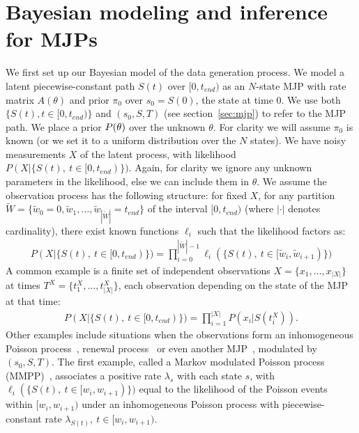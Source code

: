 \section{Bayesian modeling and inference for MJPs}
\label{sec:bayes_model}
We first set up our Bayesian model of the data generation process. 
We model a latent piecewise-constant path $S(t)$ over $[0,t_{end})$ as an $N$-state MJP with rate matrix $A(\theta)$ and prior $\pi_0$ over $s_0 = S(0)$, the state at time $0$. 
We use both $\{S(t), t \in [0,t_{end})\}$ and $(s_0,S,T)$ (see section~\ref{sec:mjp}) to refer to the MJP path.
We place a prior $P(\theta)$ over the unknown $\theta$. 
For clarity we will assume $\pi_0$ is known (or we set it to a uniform distribution over the $N$ states). 
We have noisy measurements $X$ of the latent process, with likelihood $P(X|\{S(t),\ t \in [0,t_{end})\})$.
Again, for clarity we ignore any unknown parameters in the likelihood, else we can include them in $\theta$.
We assume the observation process has the following structure: for fixed $X$, for any partition $\tilde{W} = \{\tilde{w}_0 = 0, \tilde{w}_1, \dotsc, \tilde{w}_{|\tilde{W}|}=t_{end}\}$ of the interval $[0,t_{end})$ (where $|\cdot|$ denotes cardinality), there exist known functions $\ell_i$ such that the likelihood factors as:
\begin{align}
  \label{eq:lik_factor}
  P(X|\{S(t),\ t \in [0,t_{end})\}) = \prod_{i=0}^{|\tilde{W}|-1} \ell_i(\{S(t),\ t \in [\tilde{w}_{i},\tilde{w}_{i+1})\})
\end{align}
A common example is a finite set of independent observations $X = \{x_1,\dotsc,x_{|X|}\}$ at times $T^X = \{t^X_1,\dotsc, t^X_{|X|}\}$, each observation depending on the state of the MJP at that time:
\begin{align}
  \label{eq:lik_iid}
  P(X|\{S(t),\ t \in [0,t_{end})\}) = \prod_{i=1}^{|X|} P(x_i|S(t^X_i)).
\end{align}
Other examples include situations when the observations form an inhomogeneous Poisson process~\citep{FearnSher2006}, renewal process~\citep{rao2011gaussian} or even another MJP~\citep{Nodelman+al:UAI02,RaoTeh13}, modulated by $(s_0, S, T)$.
The first example, called a Markov modulated Poisson process (MMPP)~\citep{scottmmpp03}, associates a positive rate $\lambda_s$ with each state $s$, with $\ell_i(\{S(t),\ t \in [w_{i},w_{i+1})\})$ equal to the likelihood of the Poisson events within $[w_{i},w_{i+1})$ under an inhomogeneous Poisson process with piecewise-constant rate $\lambda_{S(t)},\ t \in [w_{i},w_{i+1})$.

